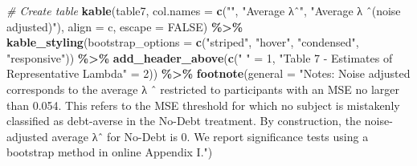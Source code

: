 \documentclass[
]{article}
\newenvironment{Shaded}{\begin{snugshade}}{\end{snugshade}}
\newcommand{\AttributeTok}[1]{\textcolor[rgb]{0.13,0.29,0.53}{#1}}
\newcommand{\CommentTok}[1]{\textcolor[rgb]{0.56,0.35,0.01}{\textit{#1}}}
\newcommand{\ConstantTok}[1]{\textcolor[rgb]{0.56,0.35,0.01}{#1}}
\newcommand{\DecValTok}[1]{\textcolor[rgb]{0.00,0.00,0.81}{#1}}
\newcommand{\FunctionTok}[1]{\textcolor[rgb]{0.13,0.29,0.53}{\textbf{#1}}}
\newcommand{\NormalTok}[1]{#1}
\newcommand{\OtherTok}[1]{\textcolor[rgb]{0.56,0.35,0.01}{#1}}
\newcommand{\SpecialCharTok}[1]{\textcolor[rgb]{0.81,0.36,0.00}{\textbf{#1}}}
\newcommand{\StringTok}[1]{\textcolor[rgb]{0.31,0.60,0.02}{#1}}
\begin{document}
\begin{Shaded}
\begin{Highlighting}[]
\CommentTok{\# Create table}
\FunctionTok{kable}\NormalTok{(table7, }
      \AttributeTok{col.names =} \FunctionTok{c}\NormalTok{(}\StringTok{""}\NormalTok{, }\StringTok{"Average λˆ"}\NormalTok{, }\StringTok{"Average λ ˆ(noise adjusted)"}\NormalTok{),}
      \AttributeTok{align =} \StringTok{\textquotesingle{}c\textquotesingle{}}\NormalTok{, }\AttributeTok{escape =} \ConstantTok{FALSE}\NormalTok{) }\SpecialCharTok{\%\textgreater{}\%}
  \FunctionTok{kable\_styling}\NormalTok{(}\AttributeTok{bootstrap\_options =} \FunctionTok{c}\NormalTok{(}\StringTok{"striped"}\NormalTok{, }\StringTok{"hover"}\NormalTok{, }\StringTok{"condensed"}\NormalTok{, }\StringTok{"responsive"}\NormalTok{)) }\SpecialCharTok{\%\textgreater{}\%}
  \FunctionTok{add\_header\_above}\NormalTok{(}\FunctionTok{c}\NormalTok{(}\StringTok{" "} \OtherTok{=} \DecValTok{1}\NormalTok{, }\StringTok{"Table 7 {-} Estimates of Representative Lambda"} \OtherTok{=} \DecValTok{2}\NormalTok{)) }\SpecialCharTok{\%\textgreater{}\%}
  \FunctionTok{footnote}\NormalTok{(}\AttributeTok{general =} \StringTok{"Notes: Noise adjusted corresponds to the average λ ˆ restricted to participants with an MSE no larger than 0.054. This refers to the MSE threshold for which no subject is mistakenly classified as debt{-}averse in the No{-}Debt treatment. By construction, the noise{-}adjusted average λˆ for No{-}Debt is 0. We report significance tests using a bootstrap method in online Appendix I."}\NormalTok{)}
\end{Highlighting}
\end{Shaded}
\end{document}
